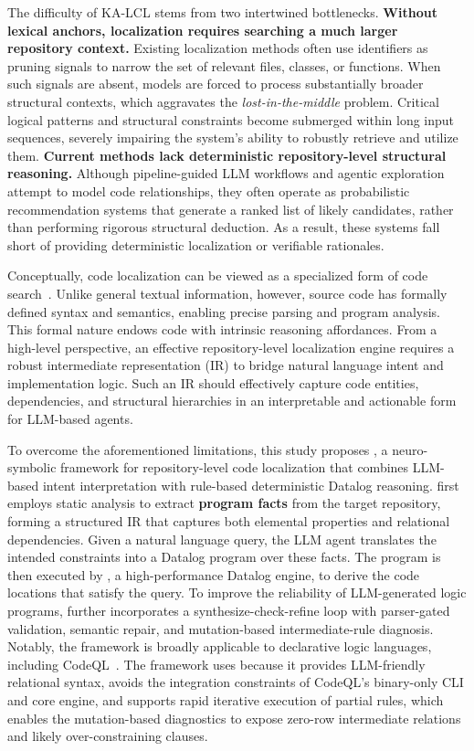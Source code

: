 The difficulty of KA-LCL stems from two intertwined bottlenecks.  \textbf{Without lexical anchors, localization requires searching a much larger repository context.} Existing localization methods often use identifiers as pruning signals to narrow the set of relevant files, classes, or functions. When such signals are absent, models are forced to process substantially broader structural contexts, which aggravates the \textit{lost-in-the-middle} problem. Critical logical patterns and structural constraints become submerged within long input sequences, severely impairing the system's ability to robustly retrieve and utilize them.  \textbf{Current methods lack deterministic repository-level structural reasoning.} Although pipeline-guided LLM workflows and agentic exploration attempt to model code relationships, they often operate as probabilistic recommendation systems that generate a ranked list of likely candidates, rather than performing rigorous structural deduction. As a result, these systems fall short of providing deterministic localization or verifiable rationales.

Conceptually, code localization can be viewed as a specialized form of code search~\cite{di2023code}. Unlike general textual information, however, source code has formally defined syntax and semantics, enabling precise parsing and program analysis. This formal nature endows code with intrinsic reasoning affordances. From a high-level perspective, an effective repository-level localization engine requires a robust intermediate representation (IR) to bridge natural language intent and implementation logic. Such an IR should effectively capture code entities, dependencies, and structural hierarchies in an interpretable and actionable form for LLM-based agents.

To overcome the aforementioned limitations, this study proposes \tooldataloc, a neuro-symbolic framework for repository-level code localization that combines LLM-based intent interpretation with rule-based deterministic Datalog reasoning. \tooldataloc first employs static analysis to extract \textbf{program facts} from the target repository, forming a structured IR that captures both elemental properties and relational dependencies. Given a natural language query, the LLM agent translates the intended constraints into a Datalog program over these facts. The program is then executed by \textbf{\souffle}, a high-performance Datalog engine, to derive the code locations that satisfy the query. To improve the reliability of LLM-generated logic programs, \tooldataloc further incorporates a synthesize-check-refine loop with parser-gated validation, semantic repair, and mutation-based intermediate-rule diagnosis. Notably, the framework is broadly applicable to declarative logic languages, including CodeQL~\cite{github:codeql}. The framework uses \souffle because it provides LLM-friendly relational syntax, avoids the integration constraints of CodeQL’s binary-only CLI and core engine, and supports rapid iterative execution of partial rules, which enables the mutation-based diagnostics to expose zero-row intermediate relations and likely over-constraining clauses.


